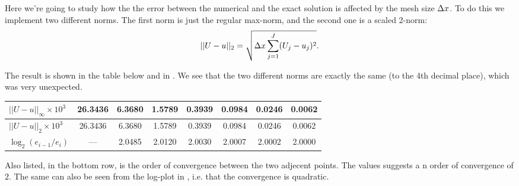 \documentclass[11pt,letter, swedish, english
]{article}
\begin{document}
Here we're going to study how the the error between the numerical
and the exact solution is affected by the mesh size $\Delta{x}$. To do this
we implement two different norms. The first norm is just the regular
max-norm, and the second one is a scaled 2-norm:
\begin{equation}
||U-u||_2=\sqrt{\Delta{x}\sum_{j=1}^J(U_j-u_j)^2}.
\end{equation}

The result is shown in the table below and in . We see
that the two different norms are exactly the same (to the 4th decimal
place), which was very unexpected. 
\begin{center}
\begin{tabular}{|l|c|c|c|c|c|c|c|}\hline
$||U-u||_\infty\times10^3$&26.3436&6.3680&1.5789&0.3939&0.0984&0.0246&0.0062\\
\hline
$||U-u||_2\times10^3$&26.3436&6.3680&1.5789&0.3939&0.0984&0.0246&0.0062\\
\hline
$\log_2(e_{i-1}/e_{i})$&---&2.0485&2.0120&2.0030&2.0007&2.0002&2.0000\\
\hline
\end{tabular}
\end{center}
Also listed, in the bottom row, is the order of convergence between
the two adjecent points. The values suggests a n order of convergence
of $2$. The same can also be seen from the log-plot in
, i.e. that the convergence is quadratic.
\end{document}

